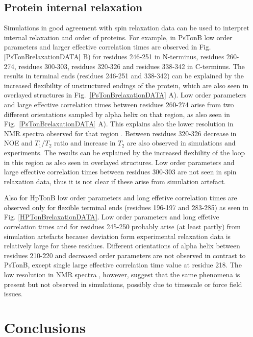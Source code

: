 \documentclass[pre,aps,floatfix,authordate1-4,twocolumn]{revtex4-1}
\begin{document}
\subsection{Protein internal relaxation}

Simulations in good agreement with spin relaxation data can be used
to interpret internal relaxation and order of proteins. For example,
in PsTonB low order parameters and larger effective correlation times
are observed in Fig. \ref{PsTonBrelaxationDATA} B) for residues 246-251
in N-terminus, residues 260-274, residues 300-303, residues 320-326
and residues 338-342 in C-terminus. The results in terminal ends
(residues 246-251 and 338-342)
can be explained by the increased flexibility of unstructured endings
of the protein, which are also seen in overlayed structures in
Fig.~\ref{PsTonBrelaxationDATA} A). Low order parameters and
large effective correlation times between residues 260-274 arise
from two different orientations sampled by alpha helix on that region, as also
seen in Fig.~\ref{PsTonBrelaxationDATA} A). This explains also the
lower resolution in NMR spectra observed for that region \cite{??}.
Between residues 320-326 decrease in NOE and $T_1/T_2$ ratio and increase
in $T_2$ are also observed in simulations and experiments. The results
can be explained by the increased flexbility of the loop in this region
as also seen in overlayed structures. Low order parameters and large
effective correlation times between residues 300-303 are not seen
in spin relaxation data, thus it is not clear if these arise from
simulation artefact.

Also for HpTonB low order parameters and long effetive correlation times
are observed only for flexible terminal ends (residues 196-197 and 283-285)
as seen in Fig. \ref{HPTonBrelaxationDATA}. Low order parameters and long
effetive correlation times and for residues 245-250 probably arise
(at least partly) from simulation artefacts because deviation form experimental
relaxation data is relatively large for these residues.
Different orientations of alpha helix between residues 210-220 and
decreased order parameters are not observed in contrast to PsTonB,
except single large effective correlation time value at residue 218.
The low resolution in NMR spectra \cite{??}, however, suggest that
the same phenomena is present but not observed in simulations, possibly
due to timescale or force field issues.

\section{Conclusions}
\end{document}
